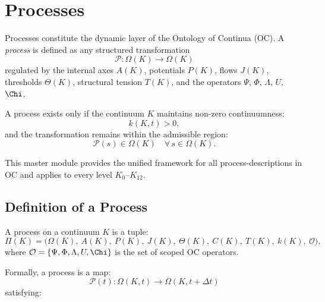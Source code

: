 

\section{Processes}
\label{sec:processes-master}

Processes constitute the dynamic layer of the Ontology of Continua (OC).  
A \emph{process} is defined as any structured transformation
\[
\mathcal{P}: \Omega(K) \longrightarrow \Omega(K)
\]
regulated by the internal axes $A(K)$, potentials $P(K)$, flows $J(K)$,
thresholds $\Theta(K)$, structural tension $T(K)$, and the operators 
$\Psi$, $\Phi$, $\Lambda$, $U$, $\Chi$.

A process exists only if the continuum $K$ maintains
non-zero continuumness:
\[
k(K,t) > 0,
\]
and the transformation remains within the admissible region:
\[
\mathcal{P}(s) \in \Omega(K) \quad \forall\, s \in \Omega(K).
\]

This master module provides the unified framework for all
process-descriptions in OC and applies to every level $K_0$--$K_{12}$.

\subsection{Definition of a Process}

A process on a continuum $K$ is a tuple:
\[
\Pi(K) = 
\bigl(
\Omega(K),\ 
A(K),\ 
P(K),\ 
J(K),\ 
\Theta(K),\ 
C(K),\ 
T(K),\ 
k(K),\ 
\mathcal{O}
\bigr),
\]
where $\mathcal{O} = \{\Psi, \Phi, \Lambda, U, \Chi\}$ is the set of
scoped OC operators.

Formally, a process is a map:
\[
\mathcal{P}(t): \Omega(K,t) \to \Omega(K,t+\Delta t)
\]
satisfying:

